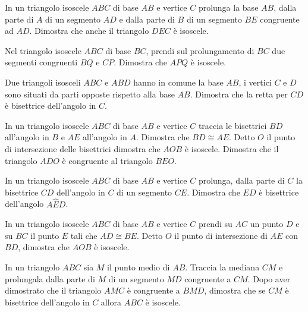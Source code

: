 \begin{multicols}{2}
\begin{esercizio}
\label{ese:2.38}
In un triangolo isoscele $ABC$ di base $AB$ e vertice $C$ prolunga la base $AB$, dalla parte di $A$ di un segmento $AD$ e dalla parte di $B$ di un segmento $BE$ congruente ad $AD$. Dimostra che anche il triangolo $DEC$ è isoscele.
\end{esercizio}

\begin{esercizio}
\label{ese:2.39}
Nel triangolo isoscele $ABC$ di base $BC$, prendi sul prolungamento di $BC$ due segmenti congruenti $BQ$ e $CP$. Dimostra che $APQ$ è isoscele.
\end{esercizio}

\begin{esercizio}
\label{ese:2.40}
Due triangoli isosceli $ABC$ e $ABD$ hanno in comune la base $AB$, i vertici $C$ e $D$ sono situati da parti opposte rispetto alla base $AB$. Dimostra che la retta per $CD$ è bisettrice dell'angolo in $C$.
\end{esercizio}

\begin{esercizio}
\label{ese:2.41}
In un triangolo isoscele $ABC$ di base $AB$ e vertice $C$ traccia le bisettrici $BD$ all'angolo in $B$ e $AE$ all'angolo in $A$. Dimostra che $BD\cong AE$. Detto $O$ il punto di intersezione delle bisettrici dimostra che $AOB$ è isoscele. Dimostra che il triangolo $ADO$ è congruente al triangolo $BEO$.
\end{esercizio}

\begin{esercizio}
\label{ese:2.42}
In un triangolo isoscele $ABC$ di base $AB$ e vertice $C$ prolunga, dalla parte di $C$ la bisettrice $CD$ dell'angolo in $C$ di un segmento $CE$. Dimostra che $ED$ è bisettrice dell'angolo $A\widehat{E}D$.
\end{esercizio}

\begin{esercizio}
\label{ese:2.43}
In un triangolo isoscele $ABC$ di base $AB$ e vertice $C$ prendi su $AC$ un punto $D$ e su $BC$ il punto $E$ tali che $AD\cong BE$. Detto $O$ il punto di intersezione di $AE$ con $BD$, dimostra che $AOB$ è isoscele.
\end{esercizio}

\begin{esercizio}
\label{ese:2.44}
In un triangolo $ABC$ sia $M$ il punto medio di $AB$. Traccia la mediana $CM$ e prolungala dalla parte di $M$ di un segmento $MD$ congruente a $CM$. Dopo aver dimostrato che il triangolo $AMC$ è congruente a $BMD$, dimostra che se $CM$ è bisettrice dell'angolo in $C$ allora $ABC$ è isoscele.
\end{esercizio}


\end{multicols}

